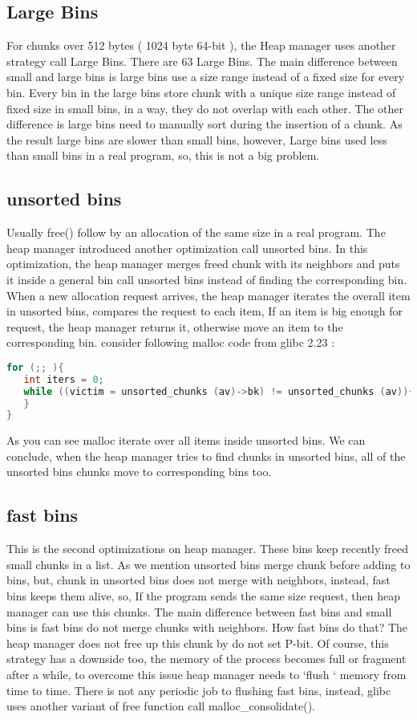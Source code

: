 \documentclass{masterthesis}
\newcommand*\libc{glibc}
\newcommand*\fb{fast bins}
\newcommand*\ub{unsorted bins}
\begin{document}
\subsection{Large Bins}
For chunks over 512 bytes ( 1024 byte 64-bit ), the Heap manager uses another strategy call Large Bins. There are 63 Large Bins. The main difference between small and large bins is large bins use a size range instead of a fixed size for every bin. Every bin in the large bins store chunk with a unique size range instead of fixed size in small bins, in a way, they do not overlap with each other.
The other difference is large bins need to manually sort during the insertion of a chunk. As the result large bins are slower than small bins, however, Large bins used less than small bins in a real program, so, this is not a big problem.

\subsection{\ub{}}
Usually free() follow by an allocation of the same size in a real program. The heap manager introduced another optimization call \ub{}. In this optimization, the heap manager merges freed chunk with its neighbors and puts it inside a general bin call \ub{} instead of finding the corresponding bin. When a new allocation request arrives, the heap manager iterates the overall item in \ub{}, compares the request to each item, If an item is big enough for request, the heap manager returns it, otherwise move an item to the corresponding bin. consider following malloc code from \libc{} 2.23 :
\begin{lstlisting}[language=c,frame=tlrb]
for (;; ){
   int iters = 0;
   while ((victim = unsorted_chunks (av)->bk) != unsorted_chunks (av)){
   }
}
\end{lstlisting}
As you can see malloc iterate over all items inside \ub{}. We can conclude, when the heap manager tries to find chunks in unsorted bins, all of the unsorted bins chunks move to corresponding bins too.

\subsection{\fb{}}
This is the second optimizations on heap manager. These bins keep recently freed small chunks in a list. As we mention \ub{} merge chunk before adding to bins, but, chunk in \ub{} does not merge with neighbors, instead, \fb{} keeps them alive, so, If the program sends the same size request, then heap manager can use this chunks.
The main difference between \fb{} and small bins is \fb{} do not merge chunks with neighbors. How \fb{} do that? The heap manager does not free up this chunk by do not set P-bit. Of course, this strategy has a downside too, the memory of the process becomes full or fragment after a while, to overcome this issue heap manager needs to ‘flush ‘ memory from time to time. There is not any periodic job to flushing \fb{}, instead, \libc{} uses another variant of free function call malloc\_consolidate(). 
\end{document}
